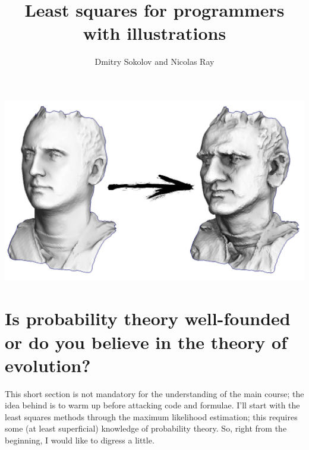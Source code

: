 \documentclass[notitlepage]{report}
\title{{\Huge Least squares for programmers}\\
{\large with illustrations}\\
\vspace{20mm}}
\author{Dmitry Sokolov and Nicolas Ray}
\date{}
\makeatletter
\newcommand*{\toccontents}{\@starttoc{toc}}
\makeatother
\begin{document}
\maketitle

\vspace{10mm}

\toccontents

\vspace{10mm}
\begin{center}
\includegraphics[width=.8\linewidth]{caricature.jpg}
\end{center}

\chapter{Is probability theory well-founded or do you believe in the theory of evolution?}

This short section is not mandatory for the understanding of the main course; 
the idea behind is to warm up before attacking code and formulae.
I’ll start with the least squares methods through the maximum likelihood estimation;
this requires some (at least superficial) knowledge of probability theory. 
So, right from the beginning, I would like to digress a little.
\end{document}
